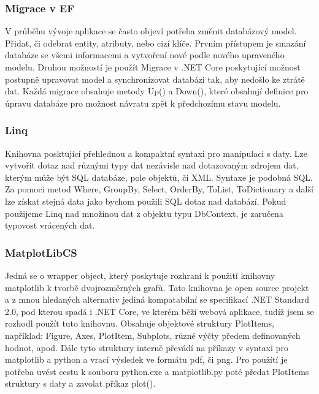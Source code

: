 \documentclass[FM,BP]{tulthesis}
\begin{document}
            \subsubsection{Migrace v EF}
                V průběhu vývoje aplikace se často objeví potřeba změnit databázový model. Přidat, či odebrat entity, atributy, nebo cizí klíče.
                Prvním přístupem je smazání databáze se všemi informacemi a vytvoření nové podle nového upraveného modelu.
                Druhou možností je použít Migrace v .NET Core poskytující možnost postupně upravovat model a synchronizovat databázi tak, aby nedošlo ke ztrátě dat.
                Každá migrace obsahuje metody Up() a Down(), které obsahují definice pro úpravu databáze pro možnost návratu zpět k předchozímu stavu modelu. 
                \cite{23}

            \subsubsection{Linq}
                Knihovna posktující přehlednou a kompaktní syntaxi pro manipulaci s daty. 
                Lze vytvořit dotaz nad různými typy dat nezávisle nad dotazovaným zdrojem dat, kterým může být SQL databáze, pole objektů, či XML. 
                Syntaxe je podobná SQL. Za pomoci metod Where, GroupBy, Select, OrderBy, ToList, ToDictionary a další lze získat stejná data jako bychom použili SQL dotaz nad databází.
                Pokud použijeme Linq nad množinou dat z objektu typu DbContext, je zaručena typovost vrácených dat.
                \cite{5}

            \subsubsection{MatplotLibCS}
                Jedná se o wrapper object, který poskytuje rozhraní k použití knihovny matplotlib k tvorbě dvojrozměrných grafů. 
                Tato knihovna je open source projekt a z mnou hledaných alternativ jediná kompatabilní se specifikací .NET Standard 2.0, pod kterou spadá i .NET Core, 
                ve kterém běží webová aplikace, 
                tudíž jsem se rozhodl použít tuto knihovnu. 
                Obsahuje objektové struktury PlotItems, například: Figure, Axes, PlotItem, Subplots, různé výčty předem definovaných hodnot, apod. 
                Dále tyto struktury interně převádí na příkazy v syntaxi pro matplotlib a python a vrací výsledek ve formátu pdf, či png. \cite{28}
                Pro použítí je potřeba uvést cestu k souboru python.exe a matplotlib.py poté předat PlotItems struktury s daty a zavolat příkaz plot().
\end{document}
